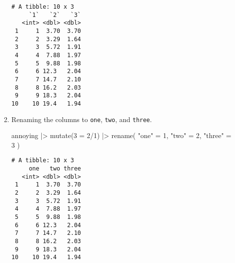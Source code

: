 \documentclass[
  letterpaper,
  DIV=11,
  numbers=noendperiod]{scrreprt}
\newenvironment{Shaded}{\begin{snugshade}}{\end{snugshade}}
\newcommand{\AttributeTok}[1]{\textcolor[rgb]{0.40,0.45,0.13}{#1}}
\newcommand{\FunctionTok}[1]{\textcolor[rgb]{0.28,0.35,0.67}{#1}}
\newcommand{\NormalTok}[1]{\textcolor[rgb]{0.00,0.23,0.31}{#1}}
\newcommand{\OtherTok}[1]{\textcolor[rgb]{0.00,0.23,0.31}{#1}}
\newcommand{\SpecialCharTok}[1]{\textcolor[rgb]{0.37,0.37,0.37}{#1}}
\newcommand{\StringTok}[1]{\textcolor[rgb]{0.13,0.47,0.30}{#1}}
\begin{document}
\begin{enumerate}
\begin{enumerate}
\begin{tcolorbox}
\begin{verbatim}
# A tibble: 10 x 3
     `1`   `2`   `3`
   <int> <dbl> <dbl>
 1     1  3.70  3.70
 2     2  3.29  1.64
 3     3  5.72  1.91
 4     4  7.88  1.97
 5     5  9.88  1.98
 6     6 12.3   2.04
 7     7 14.7   2.10
 8     8 16.2   2.03
 9     9 18.3   2.04
10    10 19.4   1.94
\end{verbatim}

    \end{tcolorbox}
  \item
    Renaming the columns to \texttt{one}, \texttt{two}, and
    \texttt{three}.

    \begin{tcolorbox}[enhanced jigsaw, breakable, bottomtitle=1mm, left=2mm, colback=white, toprule=.15mm, leftrule=.75mm, colframe=quarto-callout-note-color-frame, colbacktitle=quarto-callout-note-color!10!white, title={Answer}, coltitle=black, toptitle=1mm, bottomrule=.15mm, opacitybacktitle=0.6, arc=.35mm, rightrule=.15mm, titlerule=0mm, opacityback=0]

\begin{Shaded}
\begin{Highlighting}[]
\NormalTok{annoying }\SpecialCharTok{|\textgreater{}} 
  \FunctionTok{mutate}\NormalTok{(}\StringTok{\textasciigrave{}}\AttributeTok{3}\StringTok{\textasciigrave{}} \OtherTok{=} \StringTok{\textasciigrave{}}\AttributeTok{2}\StringTok{\textasciigrave{}}\SpecialCharTok{/}\StringTok{\textasciigrave{}}\AttributeTok{1}\StringTok{\textasciigrave{}}\NormalTok{) }\SpecialCharTok{|\textgreater{}} 
    \FunctionTok{rename}\NormalTok{(}
    \StringTok{"one"} \OtherTok{=} \StringTok{\textasciigrave{}}\AttributeTok{1}\StringTok{\textasciigrave{}}\NormalTok{,}
    \StringTok{"two"} \OtherTok{=} \StringTok{\textasciigrave{}}\AttributeTok{2}\StringTok{\textasciigrave{}}\NormalTok{,}
    \StringTok{"three"} \OtherTok{=} \StringTok{\textasciigrave{}}\AttributeTok{3}\StringTok{\textasciigrave{}}
\NormalTok{    )}
\end{Highlighting}
\end{Shaded}

\begin{verbatim}
# A tibble: 10 x 3
     one   two three
   <int> <dbl> <dbl>
 1     1  3.70  3.70
 2     2  3.29  1.64
 3     3  5.72  1.91
 4     4  7.88  1.97
 5     5  9.88  1.98
 6     6 12.3   2.04
 7     7 14.7   2.10
 8     8 16.2   2.03
 9     9 18.3   2.04
10    10 19.4   1.94
\end{verbatim}

    \end{tcolorbox}
  \end{enumerate}
\end{enumerate}
\end{document}
